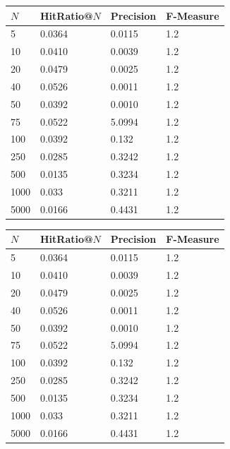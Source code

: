 \begin{table}[ht]
\centering
\small\renewcommand{\arraystretch}{1.4}  
%
\label{results_jaccard}
%
\begin{tabularx}{0.5\textwidth}{lXXX}
\hline
\rowcolor{tableheadcolor}
$N$ & HitRatio@$N$ & Precision & F-Measure \\
\hline
5 & 0.0364 & 0.0115 & 1.2 \\
10 & 0.0410 & 0.0039 & 1.2 \\
20 & 0.0479 & 0.0025 & 1.2 \\
40 & 0.0526 & 0.0011 & 1.2 \\
50 & 0.0392 & 0.0010 & 1.2 \\
75 & 0.0522 & 5.0994 & 1.2 \\
100 & 0.0392 & 0.132 & 1.2 \\
250 & 0.0285 & 0.3242 & 1.2 \\
500 & 0.0135 & 0.3234 & 1.2 \\
1000 & 0.033 & 0.3211 & 1.2 \\
5000 & 0.0166 & 0.4431 & 1.2 \\
\hline
\end{tabularx}
\end{table}

\begin{table}[ht]
\centering
\small\renewcommand{\arraystretch}{1.4}  
%
\label{results_jaccard}
%
\begin{tabularx}{0.5\textwidth}{lXXX}
\hline
\rowcolor{tableheadcolor}
$N$ & HitRatio@$N$ & Precision & F-Measure \\
\hline
5 & 0.0364 & 0.0115 & 1.2 \\
10 & 0.0410 & 0.0039 & 1.2 \\
20 & 0.0479 & 0.0025 & 1.2 \\
40 & 0.0526 & 0.0011 & 1.2 \\
50 & 0.0392 & 0.0010 & 1.2 \\
75 & 0.0522 & 5.0994 & 1.2 \\
100 & 0.0392 & 0.132 & 1.2 \\
250 & 0.0285 & 0.3242 & 1.2 \\
500 & 0.0135 & 0.3234 & 1.2 \\
1000 & 0.033 & 0.3211 & 1.2 \\
5000 & 0.0166 & 0.4431 & 1.2 \\
\hline
\end{tabularx}
\end{table}




